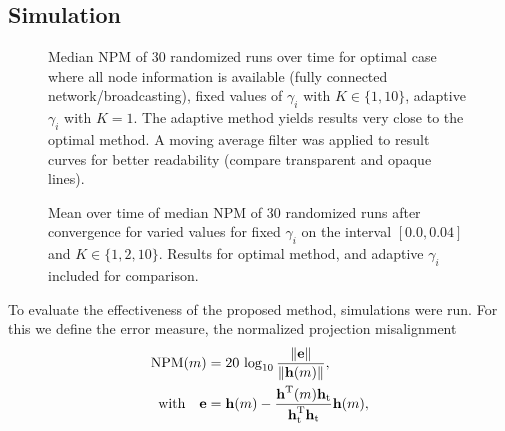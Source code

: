 \documentclass{article}
\begin{document}
%     

\subsection[]{Simulation}
\begin{figure}[t]
    \centering
    
    \caption[]{Median NPM of 30 randomized runs over time for optimal case where all node information is available (fully connected network/broadcasting), fixed values of \(\gamma_i\) with \(K \in \{1,10\}\), adaptive \(\gamma_i\) with \(K=1\). The adaptive method yields results very close to the optimal method. A moving average filter was applied to result curves for better readability (compare transparent and opaque lines).}
    \label{fig:simulations:NPMtime}
\end{figure}
\begin{figure}[t]
    \centering
    
    \caption[]{Mean over time of median NPM of 30 randomized runs after convergence for varied values for fixed \(\gamma_i\) on the interval \([0.0, 0.04]\) and \(K \in \{1,2,10\}\). Results for optimal method, and adaptive \(\gamma_i\) included for comparison.}
    \label{fig:simulations:avgNPMgamma}
\end{figure}
To evaluate the effectiveness of the proposed method, simulations were run.
For this we define the error measure, the normalized projection misalignment
\begin{equation}
    \begin{aligned}
        \text{NPM}(m) &= 20\,\log_{10} \frac{\left\| \bm{\mathrm{e}} \right\|}{\left\|\bm{\mathrm{h}}(m)\right\|},\\
        \text{with}\quad \bm{\mathrm{e}} &= \bm{\mathrm{h}}(m) - \frac{\bm{\mathrm{h}}^{\mathrm{T}} (m) \bm{\mathrm{h}}_{\text{t}}}{\bm{\mathrm{h}}_{\text{t}}^{\mathrm{T}} \bm{\mathrm{h}}_{\text{t}}}\bm{\mathrm{h}}(m),
    \end{aligned}
\end{equation}
\end{document}
